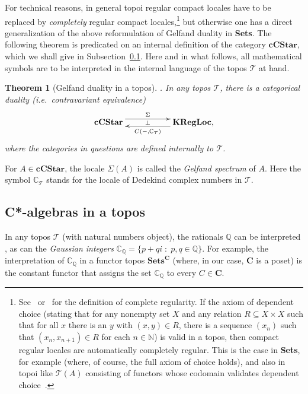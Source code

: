 \documentclass[11pt]{article}
\newcommand{\Q}{\mathbb{Q}}
\newcommand{\Sets}{\mbox{\textbf{Sets}}}
\newcommand{\Sg}{\Sigma} \newcommand{\ta}{\tau} \newcommand{\ph}{\phi}
\newcommand{\CT}{{\mathcal T}} \newcommand{\CV}{{\mathcal V}}
\newcommand{\C}{{\mathbb C}} \newcommand{\D}{{\mathbb D}}
\newcommand{\alg}[1]{\ensuremath{#1}}
\newcommand{\cat}[1]{\ensuremath{\mathbf{#1}}}
\newcommand{\Cat}[1]{\ensuremath{\mathrm{\textbf{#1}}}}
\newcommand{\Ccstar}{\Cat{cCStar}\xspace}
\newcommand{\Set}{\Cat{Sets}\xspace}
\newcommand{\cpxrat}{\ensuremath{\field{C}_\field{Q}}}
\newcommand{\asstopos}{\ensuremath{\mathcal{T}}}
\newcommand{\field}[1]{\ensuremath{\mathbb{#1}}}
\newcommand{\TA}{\mathcal{T}(A)}
\newcommand{\ie}{\textit{i.e.}}
\renewcommand{\TA}{\asstopos(\alg{A})}
\newtheorem{theorem}{Theorem}
\begin{document}
For technical reasons, in general topoi regular compact locales have to be
replaced by
{\it completely} regular compact
locales,\footnote{See~\cite{johnstone82}
or~\cite{banaschewskimulvey06} for the definition of complete
regularity.  If the axiom of dependent choice  (stating that for any
nonempty set $X$ and any relation $R \subseteq X\times X$ such that
for all $x$ there is an $y$ with $(x,y) \in R$, there is a sequence
$(x_n)$ such that $(x_n,x_{n+1}) \in R$ for each $n \in \field{N}$)
is valid in a topos, then compact regular locales are automatically
completely regular. This is the case in  \Sets, for example (where, of
course, the full axiom of choice holds), and also in topoi like $\TA$
consisting of functors whose codomain validates dependent
choice~\cite{fourmanscedrov82}.\label{footnote:completelyregular}}
  but otherwise one has a direct generalization of the above reformulation of
Gelfand duality in \Sets. The following theorem is predicated on an internal
definition of the category $\Ccstar$, which we shall give in
Subsection~\ref{subsec:cstaralgebras}. Here and in what follows, all
mathematical symbols are to be interpreted in the internal language of the topos
$\CT$ at hand.
\begin{theorem}[Gelfand duality in a topos]\emph{\cite{banaschewskimulvey00b,
banaschewskimulvey00a, banaschewskimulvey06}}.
\label{thm:gelfandrepresentation}
  In any topos $\CT$, there is a categorical duality (\ie\ contravariant
equivalence)
  \[\xymatrix{
       \Ccstar \ar@<1ex>^-{\Sg}[rr] \ar@{}|-{\perp}[rr]
    && \Cat{KRegLoc}, \ar@<1ex>^-{C(-,\field{C}_{\CT})}[ll]
  }\]
where the categories in questions are defined internally to $\CT$.
\end{theorem}
  For $A\in \Ccstar$, the locale $\Sg(\alg{A})$ is called the \emph{Gelfand
spectrum} of
  \alg{A}.
     Here the symbol $\C_{\CT}$ stands for the locale of Dedekind complex
     numbers in $\CT$.
\subsection{C*-algebras in a topos}
\label{subsec:cstaralgebras}
In any topos $\CT$ (with natural numbers object), the rationals $\Q$ can be
interpreted
\cite[\S~VI.8]{maclanemoerdijk92}, as can  the  {\it Gaussian integers}
\hbox{$\cpxrat = \{ p+qi \;:\; p,q \in\field{Q} \}$}.
For example, the interpretation of $\cpxrat$ in a functor topos
$\Set^{\cat{C}}$ (where, in our case, $\cat{C}$ is a poset) is the
constant functor that assigns the set  $\cpxrat$ to every $C \in
\cat{C}$.
\end{document}
